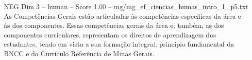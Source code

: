 \begin{textsample}{NEG Dim 3 – human – Score 1.00 – mg/mg\_ef\_ciencias\_humas\_intro\_1\_p5.txt}  \label{ex:f3_neg_015}
As Competências Gerais estão articuladas às competências específicas da área e às dos componentes.
Essas competências gerais da área e, também, as dos componentes curriculares, representam os direitos de aprendizagem dos estudantes, tendo em vista a sua formação integral, princípio fundamental da BNCC e do Currículo Referência de Minas Gerais.

\end{textsample}
